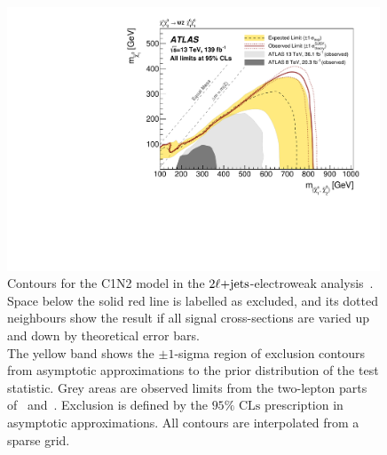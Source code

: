 
\begin{figure}[tp]
\centering
\includegraphics[width=0.99\textwidth]{figures/2ljets_contours_c1n2.pdf}
\caption{%
Contours for the C1N2 model in the $2\ell\mathrm{+jets}$-electroweak
analysis~\cite{atlas2022searches}.
\\[0.5em]
Space below the solid red line is labelled as excluded, and its dotted
neighbours show the result if all signal cross-sections are varied up and down
by theoretical error bars.
\\[0.5em]
The yellow band shows the $\pm1$-sigma region of exclusion contours
from asymptotic approximations to the prior distribution of the test statistic.
Grey areas are observed limits from the two-lepton parts
of~\cite{atlas_23l_SUSY_2016_24} and~\cite{atlas_2l_SUSY_2013_11}.
Exclusion is defined by the $95\%$ $\mathrm{CLs}$ prescription
in asymptotic approximations.
All contours are interpolated from a sparse grid.
}
\label{fig:2ljets_contours_c1n2}
\end{figure}

